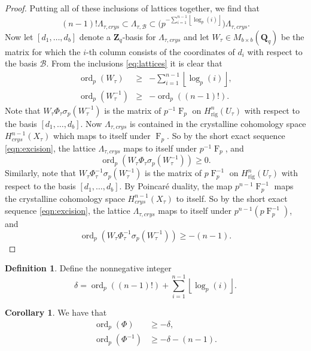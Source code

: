 \documentclass[a4paper,11pt]{article}
\numberwithin{equation}{section}
\providecommand{\floor}[1]{\left\lfloor#1\right\rfloor}   %
\newcommand{\ZZ}{\mathbf{Z}} %
\newcommand{\QQ}{\mathbf{Q}} %
\DeclareMathOperator{\ord}{ord}          %
\DeclareMathOperator{\Frob}{F}           %
\providecommand{\Hrig}{H_{\text{rig}}}  %
\providecommand{\cB}{\mathcal{B}} %
\theoremstyle{definition}
\newtheorem{cor}[thm]{Corollary}
\newtheorem{defn}[thm]{Definition}
\begin{document}
\begin{proof}
Putting all of these inclusions of lattices together, we find that
\begin{equation} \label{eq:lattices}
(n-1)! \Lambda_{\tau,crys} \subset \Lambda_{\tau,\cB} \subset \bigl( p^{-\sum_{i=1}^{n-1} \floor{\log_p(i)}} \bigr) \Lambda_{\tau,crys}.
\end{equation}
Now let $[d_1, \ldots, d_b]$ denote a $\ZZ_q$-basis for $\Lambda_{\tau,crys}$ and let $W_{\tau} \in M_{b \times b}(\QQ_q)$ be the matrix
for which the $i$-th column consists of the coordinates of $d_i$ with respect to the basis $\cB$. From the inclusions \eqref{eq:lattices}
it is clear that 
\begin{eqnarray*}
\ord_p(W_{\tau}) &\geq& -\sum_{i=1}^{n-1} \floor{\log_p(i)}, \\
\ord_p(W_{\tau}^{-1}) &\geq& -\ord_p((n-1)!).
\end{eqnarray*}
Note that $W_{\tau} \Phi_{\tau} \sigma_p(W_{\tau}^{-1})$ is the matrix of $p^{-1}\Frob_{p}$ on $\Hrig^n(U_{\tau})$
with respect to the basis $[d_1,\ldots,d_b]$. Now $\Lambda_{\tau,crys}$ is contained in the crystalline cohomology 
space $H^{n-1}_{crys}(X_{\tau})$ which maps to itself under $\Frob_p$. So by the short exact sequence 
\eqref{eqn:excision}, the lattice $\Lambda_{\tau,crys}$ maps to itself under $p^{-1}\Frob_{p}$, and
\[
\ord_p(W_{\tau} \Phi_{\tau} \sigma_p(W_{\tau}^{-1})) \geq 0.
\]
Similarly, note that $W_{\tau} \Phi_{\tau}^{-1} \sigma_p(W_{\tau}^{-1})$ is the matrix of $p\Frob_p^{-1}$ on 
$\Hrig^n(U_{\tau})$ with respect to the basis $[d_1,\ldots,d_b]$. By Poincar\'e duality, 
the map $p^{n-1}\Frob_p^{-1}$ maps the crystalline cohomology space $H^{n-1}_{crys}(X_{\tau})$
to itself. So by the short exact sequence \eqref{eqn:excision}, the lattice $\Lambda_{\tau,crys}$ 
maps to itself under $p^{n-1} (p\Frob_p^{-1})$, and 
\[
\ord_p(W_{\tau} \Phi_{\tau}^{-1} \sigma_p(W_{\tau}^{-1})) \geq -(n-1).
\]
\end{proof}

\begin{defn} \label{defn:delta}
Define the nonnegative integer
\[
\delta = \ord_p((n-1)!)+\sum_{i=1}^{n-1} \floor{\log_p(i)}.
\]
\end{defn}

\begin{cor} \label{cor:delta} We have that
\begin{align*}
\ord_p(\Phi) &\geq -\delta, \\
\ord_p(\Phi^{-1}) &\geq -\delta-(n-1).
\end{align*}
\end{cor}
\end{document}
